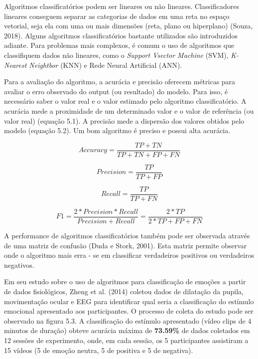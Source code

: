 Algoritmos classificatórios
podem ser lineares ou não lineares. 
Classificadores lineares conseguem separar 
as categorias de dados em uma reta no espaço vetorial, seja ela com uma ou mais dimensões (reta, plano ou hiperplano) (Souza, 2018). 
Alguns algoritmos classificatórios bastante utilizados são introduzidos adiante. Para problemas mais complexos,
é comum o uso de algoritmos que classifiquem dados não lineares, como o \textit{Support Vsector Machine} (SVM), 
\textit{K-Nearest Neightbor} (KNN) e
Rede Neural Artificial (ANN).

Para a avaliação do algoritmo, a acurácia e precisão oferecem métricas para avaliar o erro observado do output (ou resultado) do modelo. 
Para isso, é necessário saber o valor real e o valor estimado pelo algoritmo classificatório. 
A acurácia mede a proximidade de um determinado valor e o valor de referência (ou valor real) (equação 5.1). 
A precisão mede a dispersão dos valores obtidos pelo modelo (equação 5.2). Um bom algoritmo é preciso e possui alta acurácia. 

\begin{equation}
      Accuracy = \frac{TP+TN}{TP+TN+FP+FN}
\end{equation}

\begin{equation}
      Precision = \frac{TP}{TP+FP}
\end{equation}

\begin{equation}
      Recall = \frac{TP}{TP+FN}
\end{equation}

\begin{equation}
      F1 = \frac{2*Precision*Recall}{Precision+Recall} = \frac{2*TP}{2*TP+FP+FN}
\end{equation}


A performance de algoritmos classificatórios também pode ser observada através de uma matriz de confusão (Duda e Stork, 2001).
Esta matriz permite observar onde o algoritmo mais erra - se em 
classificar verdadeiros positivos ou verdadeiros negativos. 


Em seu estudo sobre o uso de algoritmos para classificação de emoções a partir de dados fisiológicos, 
Zheng et al. (2014) coletou dados de dilatação da pupila, movimentação ocular e EEG para 
identificar qual seria a classificação do estímulo emocional apresentado aos participantes. 
O processo de coleta do estudo pode ser observado na figura 5.3. 
A classificação do estímulo apresentado (vídeo clips de 4 minutos de duração) 
obteve acurácia máxima de \textbf{73.59\%} de dados coletados em 12 sessões de experimento, 
onde, em cada sessão, os 5 participantes assistiram a 15 vídeos 
(5 de emoção neutra, 5 de positiva e 5 de negativa). 
 

